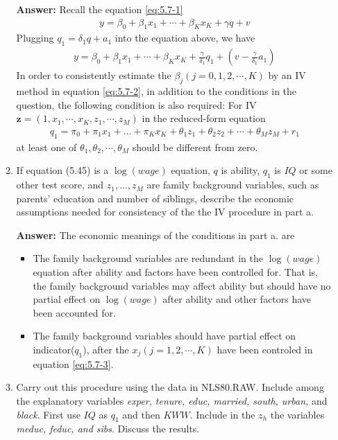 \begin{enumerate}
\begin{enumerate}
        \textbf{Answer:} Recall the equation \eqref{eq:5.7-1}
        \begin{gather}
            y=\beta_{0}+\beta_{1} x_{1}+\cdots+\beta_{K} x_{K}+\gamma q+v \tag{5.45} \label{eq:5.7-1}
        \end{gather}
        Plugging $q_{1}=\delta_{1} q+a_{1}$ into the equation above, we have
        \begin{gather}
            y=\beta_{0}+\beta_{1} x_{1}+\cdots+\beta_{K} x_{K}+\frac{\gamma}{\delta_1}q_1 + \left( v-\frac{\gamma}{\delta_1}a_1 \right) \label{eq:5.7-2}
        \end{gather}
        In order to consistently estimate the $\beta_j(j = 0,1,2,\cdots,K)$ by an IV method in equation \eqref{eq:5.7-2}, in addition to the conditions in the question, the following condition is also required: For IV $\mathbf{z}=(1,x_1,\cdots,x_K,z_1,\cdots,z_M)$ in the reduced-form equation
        \begin{gather}
            q_{1}=\pi_{0}+\pi_{1} x_{1}+\ldots+\pi_{K} x_{K}+\theta_{1} z_{1}+\theta_2 z_2 + \cdots+\theta_{M} z_{M}+r_{1} \label{eq:5.7-3}
        \end{gather}
        at least one of $\theta_1, \theta_2, \cdots, \theta_M$ should be different from zero.
        
        \item If equation (5.45) is a $\log(wage)$ equation, $q$ is ability, $q_{1}$ is $I Q$ or some other test score, and $z_{1}, \ldots, z_{M}$ are family background variables, such as parents' education and number of siblings, describe the economic assumptions needed for consistency of the the IV procedure in part a.
        
        \textbf{Answer:} The economic meanings of the conditions in part a. are
        \begin{itemize}
            \item The family background variables are redundant in the $\log(wage)$ equation after ability and factors have been controlled for. That is, the family background variables may affect ability but should have no partial effect on $\log(wage)$ after ability and other factors have been accounted for.
            \item The family background variables should have partial effect on indicator($q_1$), after the $x_j(j=1,2,\cdots,K)$ have been controled in equation \eqref{eq:5.7-3}.
        \end{itemize}
        
        \item Carry out this procedure using the data in NLS80.RAW. Include among the explanatory variables \textit{exper, tenure, educ, married, south, urban,} and \textit{black}. First use $I Q$ as $q_{1}$ and then $K W W .$ Include in the $z_{h}$ the variables \textit{meduc, feduc, and sibs}. Discuss the results.
        

\end{enumerate}
\end{enumerate}
